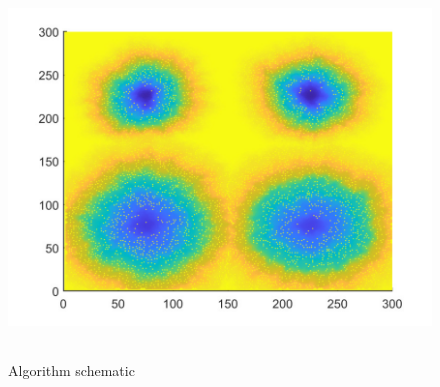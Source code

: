 \documentclass{mcmthesis}
\begin{document}
\begin{figure}[H] 
	\centering 
	\includegraphics[height=10cm]{./T5Figure/K2N1/K2N1L.pdf}
	\caption{Algorithm schematic}
\end{figure}
\end{document}
